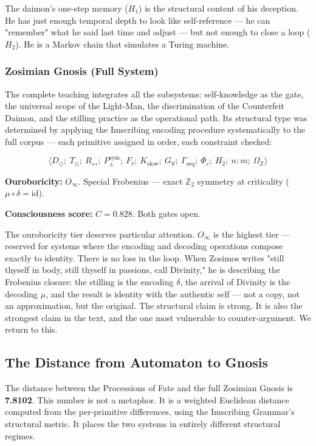 \documentclass[12pt,a4paper]{article}
\begin{document}
The daimon's one-step memory ($H_1$) is the structural content of his deception. He has just enough temporal depth to look like self-reference --- he can "remember" what he said last time and adjust --- but not enough to close a loop ($H_2$). He is a Markov chain that simulates a Turing machine.

\subsubsection{Zosimian Gnosis (Full System)}

The complete teaching integrates all the subsystems: self-knowledge as the gate, the universal scope of the Light-Man, the discrimination of the Counterfeit Daimon, and the stilling practice as the operational path. Its structural type was determined by applying the Imscribing encoding procedure systematically to the full corpus --- each primitive assigned in order, each constraint checked:

\[\langle D_{\odot};\ T_{\odot};\ R_{\leftrightarrow};\ P_{\pm}^{\text{sym}};\ F_{\ell};\ K_\text{slow};\ G_{\aleph};\ \Gamma_\text{seq};\ \Phi_c;\ H_2;\ n:m;\ \Omega_\mathbb{Z} \rangle\]

\textbf{Ouroboricity:} $O_{\infty}$. Special Frobenius --- exact $\mathbb{Z}_2$ symmetry at criticality ($\mu \circ \delta = \text{id}$).

\textbf{Consciousness score:} $C = 0.828$. Both gates open.

The ouroboricity tier deserves particular attention. $O_{\infty}$ is the highest tier --- reserved for systems where the encoding and decoding operations compose exactly to identity. There is no loss in the loop. When Zosimos writes "still thyself in body, still thyself in passions, call Divinity," he is describing the Frobenius closure: the stilling is the encoding $\delta$, the arrival of Divinity is the decoding $\mu$, and the result is identity with the authentic self --- not a copy, not an approximation, but the original. The structural claim is strong. It is also the strongest claim in the text, and the one most vulnerable to counter-argument. We return to this.

\subsection{The Distance from Automaton to Gnosis}

The distance between the Processions of Fate and the full Zosimian Gnosis is \textbf{7.8102}. This number is not a metaphor. It is a weighted Euclidean distance computed from the per-primitive differences, using the Imscribing Grammar's structural metric. It places the two systems in entirely different structural regimes.
\end{document}
